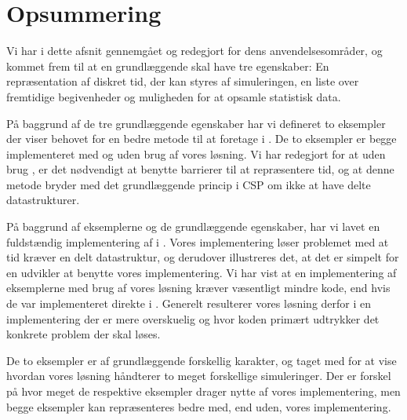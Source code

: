 \newpage\section{Opsummering}
Vi har i dette afsnit gennemgået \des og redegjort for dens anvendelsesområder, og kommet frem til at en \des grundlæggende skal have tre egenskaber: En repræsentation af diskret tid, der kan styres af simuleringen, en liste over fremtidige begivenheder og muligheden for at opsamle statistisk data. 

På baggrund af de tre grundlæggende egenskaber har vi defineret to eksempler der viser behovet for en bedre metode til at foretage \des i \pycsp. 
De to eksempler er begge implementeret med og uden brug af vores \des løsning. Vi har redegjort for at uden brug \des, er det nødvendigt at benytte barrierer til at repræsentere tid, og at denne metode bryder med det grundlæggende princip i CSP om ikke at have delte datastrukturer. 

På baggrund af eksemplerne og de grundlæggende egenskaber, har vi lavet en fuldstændig implementering af \des i \pycsp.
Vores implementering løser problemet med at tid kræver en delt datastruktur, og derudover illustreres det, at det er simpelt for en udvikler at benytte vores implementering. 
 Vi har vist  at en implementering af eksemplerne med brug af vores løsning kræver væsentligt mindre kode, end hvis de var implementeret direkte i \pycsp. Generelt resulterer vores løsning derfor i en implementering der er mere overskuelig og hvor koden primært udtrykker det konkrete problem der skal løses. 

De to eksempler er af grundlæggende forskellig karakter, og taget med for at vise hvordan vores løsning håndterer to meget forskellige simuleringer. Der er forskel på hvor meget de respektive eksempler drager nytte af vores implementering, men begge eksempler kan repræsenteres bedre med, end uden, vores implementering. 

